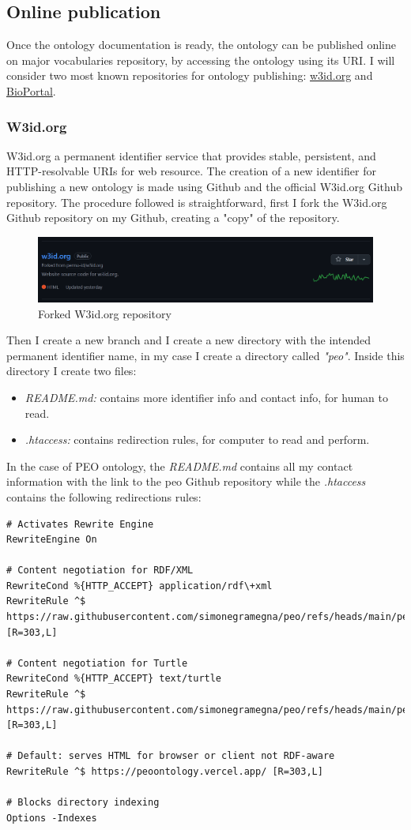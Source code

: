 \subsection{Online publication}
Once the ontology documentation is ready, the ontology can be published online on major vocabularies repository, by accessing the ontology using its URI. I will consider two most known repositories for ontology publishing: \href{https://w3id.org/}{w3id.org} and \href{https://bioportal.bioontology.org/}{BioPortal}.

\subsubsection{W3id.org}
W3id.org a permanent identifier service that provides stable, persistent, and HTTP-resolvable URIs for web resource. The creation of a new identifier for publishing a new ontology is made using Github and the official W3id.org Github repository. The procedure followed is straightforward, first I fork the W3id.org Github repository on my Github, creating a "copy" of the repository. 
\begin{figure}[H]
    \centering
    \includegraphics[width=0.9\linewidth]{Figures/fig_65.png}
    \caption{Forked W3id.org repository}
    \label{fig:enter-label}
\end{figure}
Then I create a new branch and I create a new directory with the intended permanent identifier name, in my case I create a directory called \textit{"peo"}. Inside this directory I create two files:
\begin{itemize}
    \item \textit{README.md:} contains more identifier info and contact info, for human to read.
    \item \textit{.htaccess:} contains redirection rules, for computer to read and perform.
\end{itemize}
In the case of PEO ontology, the \textit{README.md} contains all my contact information with the link to the peo Github repository while the \textit{.htaccess} contains the following redirections rules:
\begin{lstlisting}
# Activates Rewrite Engine
RewriteEngine On

# Content negotiation for RDF/XML
RewriteCond %{HTTP_ACCEPT} application/rdf\+xml
RewriteRule ^$ https://raw.githubusercontent.com/simonegramegna/peo/refs/heads/main/peo_ontology.rdf [R=303,L]

# Content negotiation for Turtle
RewriteCond %{HTTP_ACCEPT} text/turtle
RewriteRule ^$ https://raw.githubusercontent.com/simonegramegna/peo/refs/heads/main/peo_ontology.ttl [R=303,L]

# Default: serves HTML for browser or client not RDF-aware
RewriteRule ^$ https://peoontology.vercel.app/ [R=303,L]

# Blocks directory indexing
Options -Indexes
\end{lstlisting}
